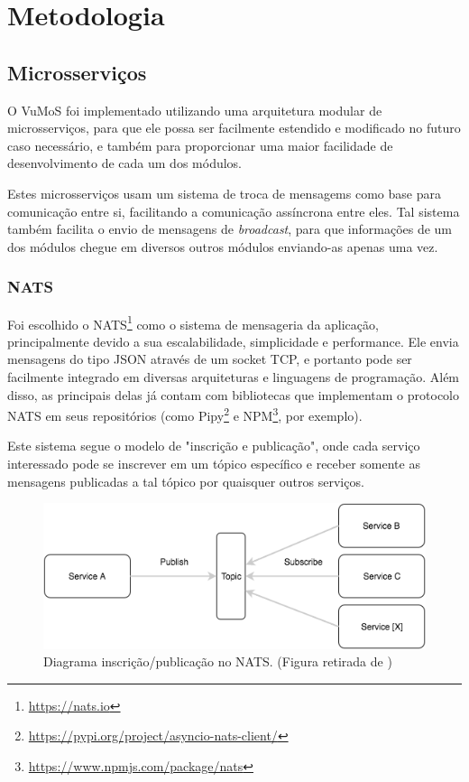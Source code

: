 \chapter{Metodologia}
\label{cap:metodologia}

\section{Microsserviços}

    O VuMoS foi implementado utilizando uma arquitetura modular de microsserviços, para que ele possa ser facilmente estendido e modificado no futuro caso necessário, e também para proporcionar uma maior facilidade de desenvolvimento de cada um dos módulos.
    
    Estes microsserviços usam um sistema de troca de mensagems como base para comunicação entre si, facilitando a comunicação assíncrona entre eles. Tal sistema também facilita o envio de mensagens de \textit{broadcast}, para que informações de um dos módulos chegue em diversos outros módulos enviando-as apenas uma vez. 
    
    \subsection{NATS}
    
    Foi escolhido o NATS\footnote{\url{https://nats.io}} como o sistema de mensageria da aplicação, principalmente devido a sua escalabilidade, simplicidade e performance. Ele envia mensagens do tipo JSON através de um socket TCP, e portanto pode ser facilmente integrado em diversas arquiteturas e linguagens de programação. Além disso, as principais delas já contam com bibliotecas que implementam o protocolo NATS em seus repositórios (como Pipy\footnote{\url{https://pypi.org/project/asyncio-nats-client/}} e NPM\footnote{\url{https://www.npmjs.com/package/nats}}, por exemplo).
    
    Este sistema segue o modelo de "inscrição e publicação", onde cada serviço interessado pode se inscrever em um tópico específico e receber somente as mensagens publicadas a tal tópico por quaisquer outros serviços. 
    
    \begin{figure}[H]
        \includegraphics[scale=0.8]{figuras/nats_diagram.png}
        \caption{Diagrama inscrição/publicação no NATS. (Figura retirada de \cite{natsmicro})\label{fig:nats-diagram}}
    \end{figure}
    
